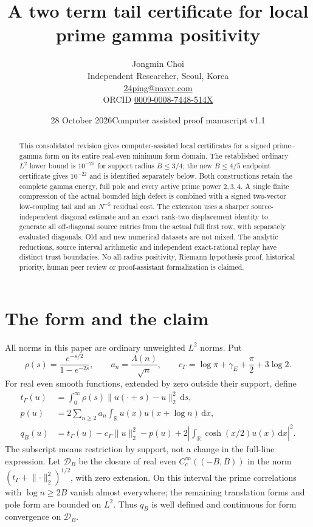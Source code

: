 \documentclass[11pt]{article}
\title{A two term tail certificate for local prime gamma positivity}
\author{Jongmin Choi\\Independent Researcher, Seoul, Korea\\
\href{mailto:24ping@naver.com}{24ping@naver.com}\\
ORCID \href{https://orcid.org/0009-0008-7448-514X}{0009-0008-7448-514X}}
\date{28 October 2026\quad Computer assisted proof manuscript v1.1}
\newcommand{\R}{\mathbb R}
\newcommand{\dd}{\,\mathrm d}
\newcommand{\norm}[1]{\lVert#1\rVert}
\begin{document}
\maketitle
\begin{abstract}
This consolidated revision gives computer-assisted local certificates for a signed prime--gamma form on its entire real-even minimum form domain. The established ordinary $L^2$ lower bound is $10^{-20}$ for support radius $B\le3/4$; the new $B\le4/5$ endpoint certificate gives $10^{-22}$ and is identified separately below. Both constructions retain the complete gamma energy, full pole and every active prime power $2,3,4$. A single finite compression of the actual bounded high defect is combined with a signed two-vector low-coupling tail and an $N^{-5}$ residual cost. The extension uses a sharper source-independent diagonal estimate and an exact rank-two displacement identity to generate all off-diagonal source entries from the actual full first row, with separately evaluated diagonals. Old and new numerical datasets are not mixed. The analytic reductions, source interval arithmetic and independent exact-rational replay have distinct trust boundaries. No all-radius positivity, Riemann hypothesis proof, historical priority, human peer review or proof-assistant formalization is claimed.
\end{abstract}


\section{The form and the claim}
All norms in this paper are ordinary unweighted $L^2$ norms. Put
\[
 \rho(s)=\frac{e^{-s/2}}{1-e^{-2s}},\qquad a_n=\frac{\Lambda(n)}{\sqrt n},\qquad
 c_\Gamma=\log\pi+\gamma_E+\frac\pi2+3\log2.
\]
For real even smooth functions, extended by zero outside their support, define
\begin{align}
 t_\Gamma(u)&=\int_0^\infty\rho(s)\norm{u(\cdot+s)-u}_2^2\dd s,\label{eq:tg}\\
 p(u)&=2\sum_{n\ge2}a_n\int_\R u(x)u(x+\log n)\dd x,\nonumber\\
 q_B(u)&=t_\Gamma(u)-c_\Gamma\norm u_2^2-p(u)
 +2\left|\int_\R\cosh(x/2)u(x)\dd x\right|^2.\label{eq:q}
\end{align}
The subscript means restriction by support, not a change in the full-line expression. Let $\mathcal D_B$ be the closure of real even $C_c^\infty((-B,B))$ in the norm $(t_\Gamma+\norm{\cdot}_2^2)^{1/2}$, with zero extension. On this interval the prime correlations with $\log n\ge2B$ vanish almost everywhere; the remaining translation forms and pole form are bounded on $L^2$. Thus $q_B$ is well defined and continuous for form convergence on $\mathcal D_B$.
\end{document}
